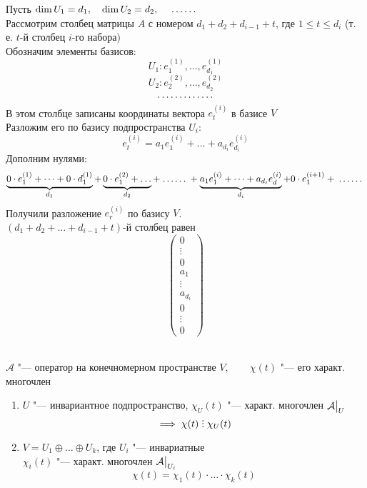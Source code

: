 \begin{eproof}
	\item Пусть $ \dim U_1 = d_1, \quad \dim U_2 = d_2, \quad \widedots[3em] $ \\
	Рассмотрим столбец матрицы $ A $ с номером $ d_1 + d_2 + d_{i - 1} + t $, где $ 1 \le t \le d_i $ (т. е. $ t $-й столбец $ i $-го набора) \\
	Обозначим элементы базисов:
	$$ U_1 : e_1^{(1)}, \dots, e_{d_1}^{(1)} $$
	$$ U_2 : e_2^{(2)}, \dots, e_{d_2}^{(2)} $$
	$$ \widedots[6em] $$
	В этом столбце записаны координаты вектора $ e_t^{(i)} $ в базисе $ V $ \\
	Разложим его по базису подпространства $ U_i $:
	$$ e_t^{(i)} = a_1e_1^{(i)} + \dots + a_{d_i}e_{d_i}^{(i)} $$
	Дополним нулями:
	$$ \underbrace{0 \cdot e_1^{(1)} + \dots + 0 \cdot d_1^{(1)}}_{d_1} + \underbrace{0 \cdot e_1^{(2)} + \dots}_{d_2} + \widedots[3em] + \underbrace{a_1e_1^{(i)} + \dots + a_{d_i}e_d^{(i)}}_{d_i} + 0 \cdot e_1^{(i + 1)} + \widedots[3em] $$
	Получили разложение $ e_r^{(i)} $ по базису $ V $. \\
	$ (d_1 + d_2 + \dots + d_{i - 1} + t) $-й столбец равен
	$$
	\begin{pmatrix}
		0 \\
		\vdots \\
		0 \\
		a_1 \\
		\vdots \\
		a_{d_i} \\
		0 \\
		\vdots \\
		0
	\end{pmatrix} $$
\end{eproof}

\begin{implication}
    \hfill \\
	$ \mathcal{A} $ "--- оператор на конечномерном пространстве $ V, \qquad \chi(t) $ "--- его характ. многочлен
	\begin{enumerate}
		\item $ U $ "--- инвариантное подпространство, $ \chi_U(t) $ "--- характ. многочлен $ \mathcal{A}\big|_{U}^{} $
		$$ \implies \chi(t) \divby \chi_U(t) $$
		\item $ V = U_1 \oplus \dots \oplus U_k $, где $ U_i $ "--- инвариатные \\
		$ \chi_i(t) $ "--- характ. многочлен $ \mathcal{A}\big|_{U_i}^{} $
		$$ \chi(t) = \chi_1(t) \cdot \dots \cdot \chi_k(t) $$
	\end{enumerate}
\end{implication}

